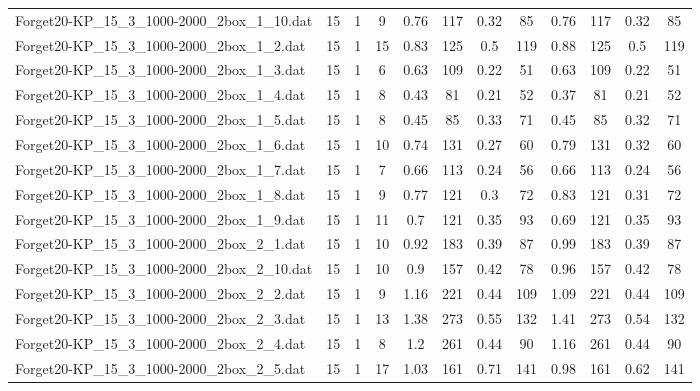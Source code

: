 \begin{sidewaystable}[!ht]
{\begin{tabular}{lccccccccccc}
Forget20-KP\_15\_3\_1000-2000\_2box\_1\_10.dat & 15 & 1 & 9 & 0.76 & 117 &  \textcolor{blue2}{0.32} & 85 & 0.76 & 117 &  \textcolor{blue2}{0.32} & 85 \\
Forget20-KP\_15\_3\_1000-2000\_2box\_1\_2.dat & 15 & 1 & 15 & 0.83 & 125 &  \textcolor{blue2}{0.5} & 119 & 0.88 & 125 &  \textcolor{blue2}{0.5} & 119 \\
Forget20-KP\_15\_3\_1000-2000\_2box\_1\_3.dat & 15 & 1 & 6 & 0.63 & 109 &  \textcolor{blue2}{0.22} & 51 & 0.63 & 109 &  \textcolor{blue2}{0.22} & 51 \\
Forget20-KP\_15\_3\_1000-2000\_2box\_1\_4.dat & 15 & 1 & 8 & 0.43 & 81 &  \textcolor{blue2}{0.21} & 52 & 0.37 & 81 &  \textcolor{blue2}{0.21} & 52 \\
Forget20-KP\_15\_3\_1000-2000\_2box\_1\_5.dat & 15 & 1 & 8 & 0.45 & 85 & 0.33 & 71 & 0.45 & 85 &  \textcolor{blue2}{0.32} & 71 \\
Forget20-KP\_15\_3\_1000-2000\_2box\_1\_6.dat & 15 & 1 & 10 & 0.74 & 131 &  \textcolor{blue2}{0.27} & 60 & 0.79 & 131 & 0.32 & 60 \\
Forget20-KP\_15\_3\_1000-2000\_2box\_1\_7.dat & 15 & 1 & 7 & 0.66 & 113 &  \textcolor{blue2}{0.24} & 56 & 0.66 & 113 &  \textcolor{blue2}{0.24} & 56 \\
Forget20-KP\_15\_3\_1000-2000\_2box\_1\_8.dat & 15 & 1 & 9 & 0.77 & 121 &  \textcolor{blue2}{0.3} & 72 & 0.83 & 121 & 0.31 & 72 \\
Forget20-KP\_15\_3\_1000-2000\_2box\_1\_9.dat & 15 & 1 & 11 & 0.7 & 121 &  \textcolor{blue2}{0.35} & 93 & 0.69 & 121 &  \textcolor{blue2}{0.35} & 93 \\
Forget20-KP\_15\_3\_1000-2000\_2box\_2\_1.dat & 15 & 1 & 10 & 0.92 & 183 & 0.39 & 87 & 0.99 & 183 & 0.39 & 87 \\
Forget20-KP\_15\_3\_1000-2000\_2box\_2\_10.dat & 15 & 1 & 10 & 0.9 & 157 &  \textcolor{blue2}{0.42} & 78 & 0.96 & 157 &  \textcolor{blue2}{0.42} & 78 \\
Forget20-KP\_15\_3\_1000-2000\_2box\_2\_2.dat & 15 & 1 & 9 & 1.16 & 221 &  \textcolor{blue2}{0.44} & 109 & 1.09 & 221 &  \textcolor{blue2}{0.44} & 109 \\
Forget20-KP\_15\_3\_1000-2000\_2box\_2\_3.dat & 15 & 1 & 13 & 1.38 & 273 & 0.55 & 132 & 1.41 & 273 &  \textcolor{blue2}{0.54} & 132 \\
Forget20-KP\_15\_3\_1000-2000\_2box\_2\_4.dat & 15 & 1 & 8 & 1.2 & 261 &  \textcolor{blue2}{0.44} & 90 & 1.16 & 261 &  \textcolor{blue2}{0.44} & 90 \\
Forget20-KP\_15\_3\_1000-2000\_2box\_2\_5.dat & 15 & 1 & 17 & 1.03 & 161 & 0.71 & 141 & 0.98 & 161 &  \textcolor{blue2}{0.62} & 141 \\

\end{tabular}}
\end{sidewaystable}
